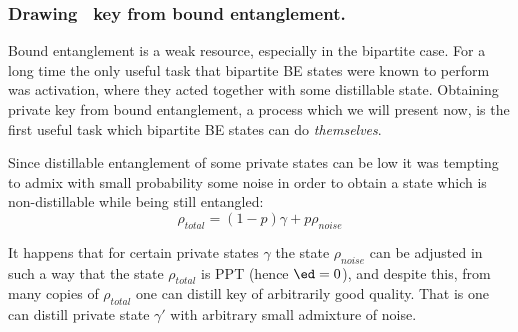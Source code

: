 \documentclass[twocolumn,aps,rmp]{revtex4}
\begin{document}
\subsubsection{Drawing \secure\ key from bound entanglement.}
\label{subsubsec:pptkey} Bound entanglement is a weak resource,
especially in the bipartite case. For a long time the only useful
task that bipartite BE states were known to perform was activation,
where they acted together with some distillable state. Obtaining
private key from bound entanglement, a process which we will present
now, is the first useful task which bipartite BE states can do {\it
themselves}.

Since distillable entanglement of some private states can be low it
was tempting to admix with small probability some noise in order to
obtain a state which is non-distillable while being still entangled:
\begin{equation} \rho_{total} = (1-p)\gamma + p\rho_{noise} \end{equation}

It happens that for certain private states $\gamma$ the state $\rho_{noise}$ can be adjusted in such a way that the state $\rho_{total}$ is PPT (hence $\ed=0$), and despite this, from many copies of $\rho_{total}$ one can distill key of arbitrarily good quality. That is one can distill private state $\gamma'$ with arbitrary small
admixture of noise.
\end{document}
